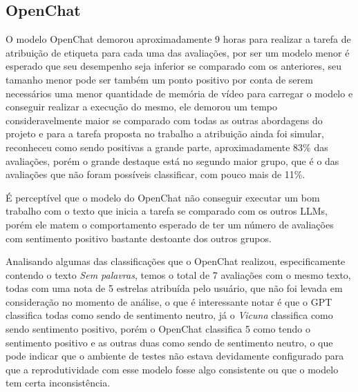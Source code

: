 \subsection{OpenChat}
\label{sec:resultados:subsec:openchat}


O modelo OpenChat demorou aproximadamente 9 horas para realizar a tarefa de atribuição de etiqueta para cada uma das avaliações, por ser um modelo menor é esperado que seu desempenho seja inferior se comparado com os anteriores, seu tamanho menor pode ser também um ponto positivo por conta de serem necessários uma menor quantidade de memória de vídeo para carregar o modelo e conseguir realizar a execução do mesmo, ele demorou um tempo consideravelmente maior se comparado com todas as outras abordagens do projeto e para a tarefa proposta no trabalho a atribuição ainda foi simular, reconheceu como sendo positivas a grande parte, aproximadamente 83\% das avaliações, porém o grande destaque está no segundo maior grupo, que é o das avaliações que não foram possíveis classificar, com pouco mais de 11\%.

É perceptível que o modelo do OpenChat não conseguir executar um bom trabalho com o texto que inicia a tarefa se comparado com os outros LLMs, porém ele matem o comportamento esperado de ter um número de avaliações com sentimento positivo bastante destoante dos outros grupos.

Analisando algumas das classificações que o OpenChat realizou, especificamente contendo o texto \textit{Sem palavras}, temos o total de 7 avaliações com o mesmo texto, todas com uma nota de 5 estrelas atribuída pelo usuário, que não foi levada em consideração no momento de análise, o que é interessante notar é que o GPT classifica todas como sendo de sentimento neutro, já o \textit{Vicuna} classifica como sendo sentimento positivo, porém o OpenChat classifica 5 como tendo o sentimento positivo e as outras duas como sendo de sentimento neutro, o que pode indicar que o ambiente de testes não estava devidamente configurado para que a reprodutividade com esse modelo fosse algo consistente ou que o modelo tem certa inconsistência.

